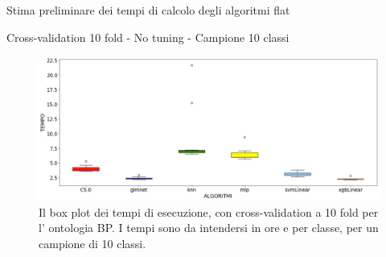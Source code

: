 \documentclass[9pt]{beamer}
\begin{document}
\begin{tframe}{Stima preliminare dei tempi di calcolo degli algoritmi flat}

\begin{center}
Cross-validation 10 fold - No tuning - Campione 10 classi
\end{center}
\begin{figure}[hp!]
\center
\includegraphics[scale=0.25]{../images/BP_box_plot_times.png}

\caption{\footnotesize{Il box plot dei tempi di esecuzione, con cross-validation a 10 fold per l' ontologia BP. I tempi sono da intendersi in ore e per classe, per un campione di 10 classi.}}
\label{boxplot_p}
\end{figure}
\end{tframe}
\end{document}
